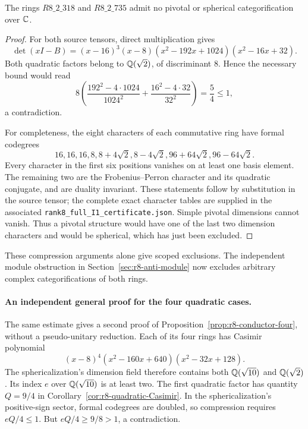 \begin{proposition}\label{prop:r8-318-735-scoped}
The rings $R8\_2\_318$ and $R8\_2\_735$ admit no pivotal or
spherical categorification over $\mathbb C$.
\end{proposition}
\begin{proof}
For both source tensors, direct multiplication gives
\[
 \det(xI-B)=(x-16)^3(x-8)(x^2-192x+1024)(x^2-16x+32).
\]
Both quadratic factors belong to $\mathbb Q(\sqrt2)$, of discriminant
$8$.  Hence the necessary bound would read
\[
 8\left(\frac{192^2-4\cdot1024}{1024^2}
       +\frac{16^2-4\cdot32}{32^2}\right)=\frac54\leq1,
\]
a contradiction.

For completeness, the eight characters of each commutative ring have
formal codegrees
\[16,16,16,8,8+4\sqrt2,8-4\sqrt2,96+64\sqrt2,96-64\sqrt2.\]
Every character in the first six positions vanishes on at least
one basis element.  The remaining two are the Frobenius--Perron
character and its quadratic conjugate, and are duality invariant.
These statements follow by substitution in the source tensor;
the complete exact character tables are supplied in the associated
\texttt{rank8\_full\_I1\_certificate.json}.
Simple pivotal dimensions cannot vanish.  Thus a pivotal structure
would have one of the last two dimension characters and would be
spherical, which has just been excluded.
\end{proof}

These compression arguments alone give scoped exclusions. The independent
module obstruction in Section~\ref{sec:r8-anti-module} now excludes arbitrary
complex categorifications of both rings.

\paragraph{An independent general proof for the four quadratic cases.}
The same estimate gives a second proof of
Proposition~\ref{prop:r8-conductor-four}, without a pseudo-unitary
reduction.  Each of its four rings has Casimir polynomial
\[
 (x-8)^4(x^2-160x+640)(x^2-32x+128).
\]
The sphericalization's dimension field therefore contains both
$\mathbb Q(\sqrt{10})$ and $\mathbb Q(\sqrt2)$.  Its index $e$ over
$\mathbb Q(\sqrt{10})$ is at least two.  The first quadratic factor has
quantity $Q=9/4$ in Corollary~\ref{cor:r8-quadratic-Casimir}.
In the sphericalization's positive-sign sector, formal codegrees are
doubled, so compression requires $eQ/4\leq1$.  But
$eQ/4\geq9/8>1$, a contradiction.
